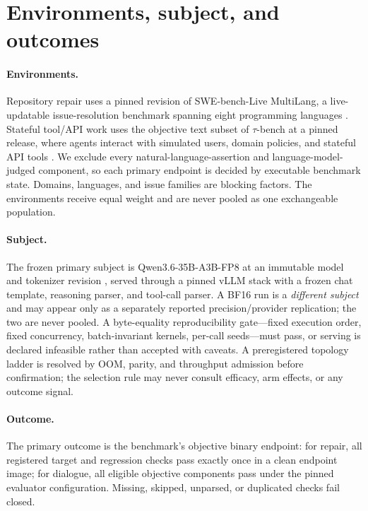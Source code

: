 \documentclass{article}
\begin{document}
\section{Environments, subject, and outcomes}
\label{sec:environments}

\paragraph{Environments.}
Repository repair uses a pinned revision of SWE-bench-Live MultiLang, a
live-updatable issue-resolution benchmark spanning eight programming languages
\cite{swebench_live_2025}. Stateful tool/API work uses the objective text subset
of $\tau$-bench at a pinned release, where agents interact with simulated users,
domain policies, and stateful API tools \cite{tau_bench_2024}. We exclude every
natural-language-assertion and language-model-judged component, so each primary
endpoint is decided by executable benchmark state. Domains, languages, and
issue families are blocking factors. The environments receive equal weight and
are never pooled as one exchangeable population.

\paragraph{Subject.}
The frozen primary subject is Qwen3.6-35B-A3B-FP8 at an immutable model and
tokenizer revision \cite{qwen36_modelcard_2026}, served through a pinned vLLM
stack \cite{kwon_pagedattention_2023} with a frozen chat template, reasoning
parser, and tool-call parser. A BF16 run is a
\emph{different subject} and may appear only as a separately reported
precision/provider replication; the two are never pooled. A byte-equality
reproducibility gate---fixed execution order, fixed concurrency, batch-invariant
kernels, per-call seeds---must pass, or serving is declared infeasible rather
than accepted with caveats. A preregistered topology ladder is resolved by OOM,
parity, and throughput admission before confirmation; the selection rule may
never consult efficacy, arm effects, or any outcome signal.

\paragraph{Outcome.}
The primary outcome is the benchmark's objective binary endpoint: for repair,
all registered target and regression checks pass exactly once in a clean
endpoint image; for dialogue, all eligible objective components pass under the
pinned evaluator configuration. Missing, skipped, unparsed, or duplicated checks
fail closed.
\end{document}
